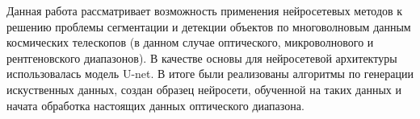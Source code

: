 \Annotation

Данная работа рассматривает возможность применения нейросетевых методов к решению проблемы 
сегментации и детекции объектов по многоволновым данным космических телескопов (в данном случае 
оптического, микроволнового и рентгеновского диапазонов). В качестве основы для нейросетевой 
архитектуры использовалась модель U-net. В итоге были реализованы алгоритмы по генерации 
искуственных данных, создан образец нейросети, обученной на таких данных и начата обработка 
настоящих данных оптического диапазона.\\
